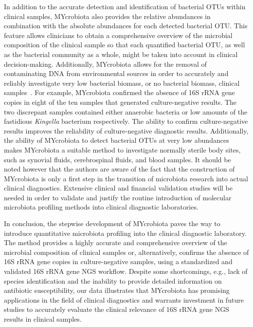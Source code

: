 In addition to the accurate detection and identification of bacterial OTUs within clinical samples, MYcrobiota also provides the relative
abundances in combination with the absolute abundances for each detected bacterial OTU\@. This feature allows clinicians to obtain a comprehensive
overview of the microbial composition of the clinical sample so that each quantified bacterial OTU, as well as the bacterial community as a whole,
might be taken into account in clinical decision-making. Additionally, MYcrobiota allows for the removal of contaminating DNA from environmental
sources in order to accurately and reliably investigate very low bacterial biomass, or no bacterial biomass, clinical samples~\cite{boers2017novel}. For example,
MYcrobiota confirmed the absence of 16S rRNA gene copies in eight of the ten samples that generated culture-negative results. The two discrepant
samples contained either anaerobic bacteria or low amounts of the fastidious \textit{Kingella} bacterium respectively. The ability to confirm culture-negative
results improves the reliability of culture-negative diagnostic results. Additionally, the ability of MYcrobiota to detect bacterial OTUs at very low
abundances makes MYcrobiota a suitable method to investigate normally sterile body sites, such as synovial fluids, cerebrospinal fluids, and blood samples.
It should be noted however that the authors are aware of the fact that the construction of MYcrobiota is only a first step in the transition of microbiota
research into actual clinical diagnostics. Extensive clinical and financial validation studies will be needed in order to validate and justify the routine
introduction of molecular microbiota profiling methods into clinical diagnostic laboratories.

In conclusion, the stepwise development of MYcrobiota paves the way to introduce quantitative microbiota profiling into the clinical diagnostic
laboratory. The method provides a highly accurate and comprehensive overview of the microbial composition of clinical samples or, alternatively,
confirms the absence of 16S rRNA gene copies in culture-negative samples, using a standardized and validated 16S rRNA gene NGS workflow. Despite
some shortcomings, e.g., lack of species identification and the inability to provide detailed information on antibiotic susceptibility, our data
illustrates that MYcrobiota has promising applications in the field of clinical diagnostics and warrants investment in future studies to accurately
evaluate the clinical relevance of 16S rRNA gene NGS results in clinical samples.

